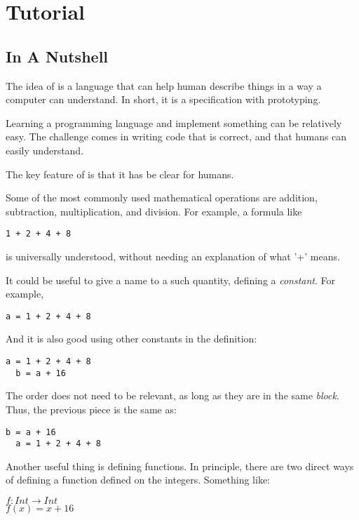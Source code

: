 \chapter{Tutorial}


\section{In A Nutshell}

The idea of \Soda is a language that can help human describe things in a way a computer can understand.
In short, it is a specification with prototyping.

Learning a programming language and implement something can be relatively easy.
The challenge comes in writing code that is correct, and that humans can easily understand.

The key feature of \Soda is that it has be clear for humans.

Some of the most commonly used mathematical operations are addition, subtraction, multiplication, and division.
For example, a formula like
\begin{lstlisting}[label={lst:exampleAddition}]
  1 + 2 + 4 + 8
\end{lstlisting}
is universally understood, without needing an explanation of what '+' means.

It could be useful to give a name to a such quantity, defining a \emph{constant}.
For example,
\begin{lstlisting}[label={lst:exampleBindingToConstant}]
  a = 1 + 2 + 4 + 8
\end{lstlisting}

And it is also good using other constants in the definition:
\begin{lstlisting}[label={lst:exampleBindingToMultipleConstants}]
  a = 1 + 2 + 4 + 8
  b = a + 16
\end{lstlisting}

The order does not need to be relevant, as long as they are in the same \emph{block}.
Thus, the previous piece is the same as:
\begin{lstlisting}[label={lst:exampleBindingToMultipleConstantsDifferentOder}]
  b = a + 16
  a = 1 + 2 + 4 + 8
\end{lstlisting}

Another useful thing is defining functions.
In principle, there are two direct ways of defining a function defined on the integers.
Something like:
\begin{center}
    $f: Int \to Int$ \\
    $f(x) = x + 16$
\end{center}

